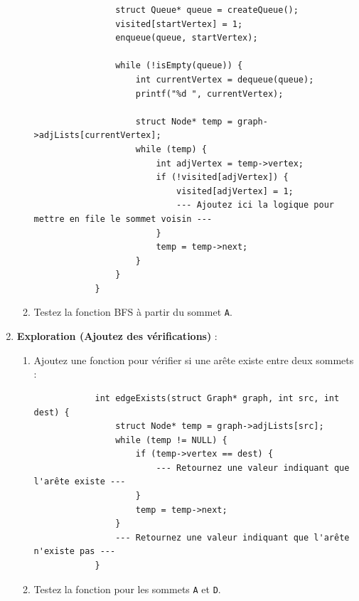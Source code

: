 \begin{enumerate}
\begin{enumerate}
\begin{verbatim}
				struct Queue* queue = createQueue();
				visited[startVertex] = 1;
				enqueue(queue, startVertex);
				
				while (!isEmpty(queue)) {
					int currentVertex = dequeue(queue);
					printf("%d ", currentVertex);
					
					struct Node* temp = graph->adjLists[currentVertex];
					while (temp) {
						int adjVertex = temp->vertex;
						if (!visited[adjVertex]) {
							visited[adjVertex] = 1;
							--- Ajoutez ici la logique pour mettre en file le sommet voisin ---
						}
						temp = temp->next;
					}
				}
			}
		\end{verbatim}
		\item Testez la fonction BFS à partir du sommet \texttt{A}.
	\end{enumerate}
	
	\item \textbf{Exploration (Ajoutez des vérifications)} :
	\begin{enumerate}
		\item Ajoutez une fonction pour vérifier si une arête existe entre deux sommets :
		\begin{verbatim}
			int edgeExists(struct Graph* graph, int src, int dest) {
				struct Node* temp = graph->adjLists[src];
				while (temp != NULL) {
					if (temp->vertex == dest) {
						--- Retournez une valeur indiquant que l'arête existe ---
					}
					temp = temp->next;
				}
				--- Retournez une valeur indiquant que l'arête n'existe pas ---
			}
		\end{verbatim}
		\item Testez la fonction pour les sommets \texttt{A} et \texttt{D}.
	\end{enumerate}
\end{enumerate}
